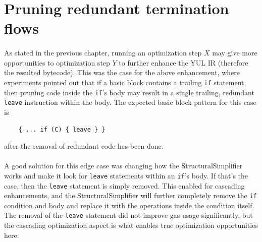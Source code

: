 \section{Pruning redundant termination flows}
\paragraph*{}
As stated in the previous chapter, running an optimization step $X$ may give more opportunities to optimization step $Y$ to further enhance the YUL IR (therefore the resulted bytecode). This was the case for the above enhancement, where experiments pointed out that if a basic block contains a trailing \lstinline[columns=fixed]{if} statement, then pruning code inside the \lstinline[columns=fixed]{if}'s body may result in a single trailing, redundant \lstinline[columns=fixed]{leave} instruction within the body. The expected basic block pattern for this case is
\begin{lstlisting}
    { ... if (C) { leave } }
\end{lstlisting}
after the removal of redundant code has been done.

\label{structural-simplifier-cascading-example}
\paragraph*{}
A good solution for this edge case was changing how the StructuralSimplifier works and make it look for \lstinline[columns=fixed]{leave} statements within an \lstinline[columns=fixed]{if}'s body. If that's the case, then the \lstinline[columns=fixed]{leave} statement is simply removed. This enabled for cascading enhancements, and the StructuralSimplifier will further completely remove the \lstinline[columns=fixed]{if} condition and body and replace it with the operations inside the condition itself. The removal of the \lstinline[columns=fixed]{leave} statement did not improve gas usage significantly, but the cascading optimization aspect is what enables true optimization opportunities here.


